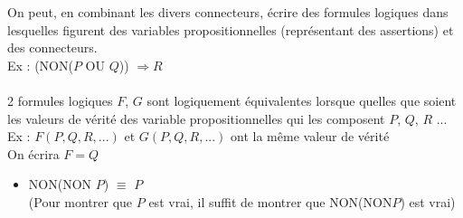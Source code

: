 \documentclass[12pt, a4paper]{report}
\begin{document}
On peut, en combinant les divers connecteurs, écrire des formules logiques dans lesquelles figurent des variables propositionnelles (représentant des assertions) et des connecteurs. \\Ex : (NON($P$ OU $Q$)) $\Longrightarrow R$\\
\\
2 formules logiques $F$, $G$ sont logiquement équivalentes lorsque quelles que soient les valeurs de vérité des variable propositionnelles qui les composent $P$, $Q$, $R$ ...\\
Ex : $F(P,Q,R,...)$ et $G(P,Q,R,...)$ ont la même valeur de vérité\\
On écrira $F=Q$\\

\begin{exemple}{}{}
\begin{itemize}
    \item NON(NON $P$) $\equiv$ $P$ \\ (Pour montrer que $P$ est vrai, il suffit de montrer que NON(NON$P$) est vrai)
\end{itemize}
\end{exemple}
\end{document}
